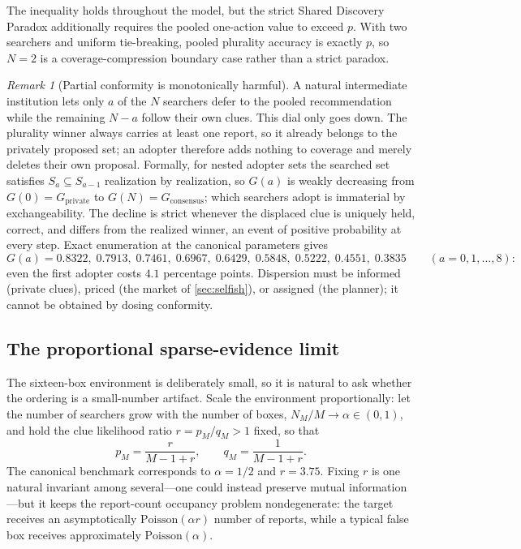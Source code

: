 \documentclass[11pt]{article}
\theoremstyle{definition}
\theoremstyle{remark}
\newtheorem{remark}{Remark}
\newcommand{\1}{\mathbf{1}}
\newcommand{\priv}{\mathrm{private}}
\newcommand{\cons}{\mathrm{consensus}}
\begin{document}
The inequality holds throughout the model, but the strict Shared Discovery Paradox additionally requires the pooled one-action value to exceed $p$. With two searchers and uniform tie-breaking, pooled plurality accuracy is exactly $p$, so $N=2$ is a coverage-compression boundary case rather than a strict paradox.

\begin{remark}[Partial conformity is monotonically harmful]
\label{rem:conformity}
A natural intermediate institution lets only $a$ of the $N$ searchers defer to the pooled recommendation while the remaining $N-a$ follow their own clues. This dial only goes down. The plurality winner always carries at least one report, so it already belongs to the privately proposed set; an adopter therefore adds nothing to coverage and merely deletes their own proposal. Formally, for nested adopter sets the searched set satisfies $S_a\subseteq S_{a-1}$ realization by realization, so $G(a)$ is weakly decreasing from $G(0)=G_{\priv}$ to $G(N)=G_{\cons}$; which searchers adopt is immaterial by exchangeability. The decline is strict whenever the displaced clue is uniquely held, correct, and differs from the realized winner, an event of positive probability at every step. Exact enumeration at the canonical parameters gives
\[
G(a)=0.8322,\;0.7913,\;0.7461,\;0.6967,\;0.6429,\;0.5848,\;0.5222,\;0.4551,\;0.3835
\qquad(a=0,1,\ldots,8):
\]
even the first adopter costs $4.1$ percentage points. Dispersion must be informed (private clues), priced (the market of \cref{sec:selfish}), or assigned (the planner); it cannot be obtained by dosing conformity.
\end{remark}

\subsection{The proportional sparse-evidence limit}
\label{sec:scaling}

The sixteen-box environment is deliberately small, so it is natural to ask whether the ordering is a small-number artifact. Scale the environment proportionally: let the number of searchers grow with the number of boxes, $N_M/M\to\alpha\in(0,1)$, and hold the clue likelihood ratio $r=p_M/q_M>1$ fixed, so that
\[
p_M=\frac{r}{M-1+r},
\qquad
q_M=\frac{1}{M-1+r}.
\]
The canonical benchmark corresponds to $\alpha=1/2$ and $r=3.75$. Fixing $r$ is one natural invariant among several---one could instead preserve mutual information---but it keeps the report-count occupancy problem nondegenerate: the target receives an asymptotically $\mathrm{Poisson}(\alpha r)$ number of reports, while a typical false box receives approximately $\mathrm{Poisson}(\alpha)$.
\end{document}
